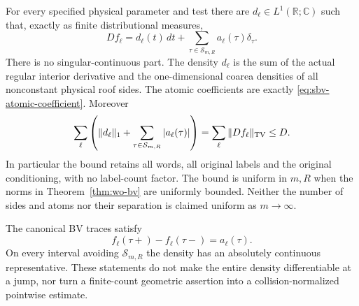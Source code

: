 \begin{theorem}
\label{thm:sbv-physical}
For every specified physical parameter and test there are
$d_\ell\in L^1(\mathbb R;\mathbb C)$ such that, exactly as
finite distributional measures,
\begin{equation}\label{eq:sbv-decomposition}
             Df_\ell=d_\ell(t)\,dt
                     +\sum_{\tau\in\mathcal S_{m,R}}
                                     a_\ell(\tau)\delta_\tau.
\end{equation}
There is no singular-continuous part.  The density $d_\ell$ is the
sum of the actual regular interior derivative and the
one-dimensional coarea densities of all nonconstant physical roof
sides.  The atomic coefficients are exactly
\eqref{eq:sbv-atomic-coefficient}.  Moreover
\begin{equation}\label{eq:sbv-budget}
 \sum_\ell\left(\|d_\ell\|_1+
                   \sum_{\tau\in\mathcal S_{m,R}}|a_\ell(\tau)|\right)
          =\sum_\ell\|Df_\ell\|_{\rm TV}\le D.
\end{equation}
In particular the bound retains all words, all original labels and
the original conditioning, with no label-count factor.  The bound
is uniform in $m,R$ when the norms in Theorem~\ref{thm:wo-bv}
are uniformly bounded.  Neither the number of sides and atoms nor
their separation is claimed uniform as $m\to\infty$.

The canonical BV traces satisfy
\begin{equation}\label{eq:sbv-jump}
            f_\ell(\tau+)-f_\ell(\tau-)=a_\ell(\tau).
\end{equation}
On every interval avoiding $\mathcal S_{m,R}$ the density has an
absolutely continuous representative.  These statements do not
make the entire density differentiable at a jump, nor turn a
finite-count geometric assertion into a collision-normalized
pointwise estimate.
\end{theorem}
